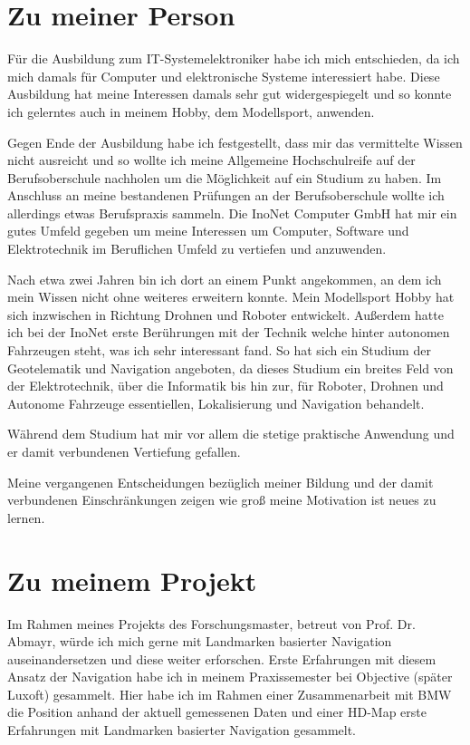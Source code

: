 \chapter{Zu meiner Person}
Für die Ausbildung zum IT-Systemelektroniker habe ich mich entschieden, da ich mich damals für Computer und elektronische Systeme interessiert habe. Diese Ausbildung hat meine Interessen damals sehr gut widergespiegelt und so konnte ich gelerntes auch in meinem Hobby, dem Modellsport, anwenden.

Gegen Ende der Ausbildung habe ich festgestellt, dass mir das vermittelte Wissen nicht ausreicht und so wollte ich meine Allgemeine Hochschulreife auf der Berufsoberschule nachholen um die Möglichkeit auf ein Studium zu haben.
Im Anschluss an meine bestandenen Prüfungen an der Berufsoberschule wollte ich allerdings etwas Berufspraxis sammeln.
Die InoNet Computer GmbH hat mir ein gutes Umfeld gegeben um meine Interessen um Computer, Software und Elektrotechnik im Beruflichen Umfeld zu vertiefen und anzuwenden.

Nach etwa zwei Jahren bin ich dort an einem Punkt angekommen, an dem ich mein Wissen nicht ohne weiteres erweitern konnte. Mein Modellsport Hobby hat sich inzwischen in Richtung Drohnen und Roboter entwickelt. Außerdem hatte ich bei der InoNet erste Berührungen mit der Technik welche hinter autonomen Fahrzeugen steht, was ich sehr interessant fand. So hat sich ein Studium der Geotelematik und Navigation angeboten, da dieses Studium ein breites Feld von der Elektrotechnik, über die Informatik bis hin zur, für Roboter, Drohnen und Autonome Fahrzeuge essentiellen, Lokalisierung und Navigation behandelt.

Während dem Studium hat mir vor allem die stetige praktische Anwendung und er damit verbundenen Vertiefung gefallen.

Meine vergangenen Entscheidungen bezüglich meiner Bildung und der damit verbundenen Einschränkungen zeigen wie groß meine Motivation ist neues zu lernen.

\chapter{Zu meinem Projekt}
Im Rahmen meines Projekts des Forschungsmaster, betreut von Prof. Dr. Abmayr, würde ich mich gerne mit Landmarken basierter Navigation auseinandersetzen und diese weiter erforschen.
Erste Erfahrungen mit diesem Ansatz der Navigation habe ich in meinem Praxissemester bei Objective (später Luxoft) gesammelt. Hier habe ich im Rahmen einer Zusammenarbeit mit BMW die Position anhand der aktuell gemessenen Daten und einer HD-Map erste Erfahrungen mit Landmarken basierter Navigation gesammelt.

